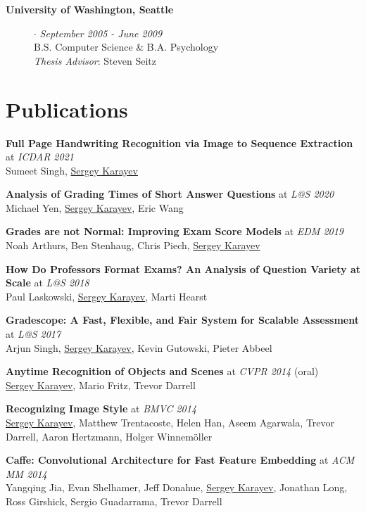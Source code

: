 \documentclass[line, margin]{res}
\begin{document}
\begin{resume}
\begin{description}
\item[{\bf University of Washington, Seattle}] $\cdot$ {\it September 2005 - June 2009}
\\B.S. Computer Science \& B.A. Psychology
\\\emph{Thesis Advisor}: Steven Seitz
\end{description}


\section{\sc Publications}

\textbf{Full Page Handwriting Recognition via Image to Sequence Extraction} at \emph{ICDAR 2021}\\
Sumeet Singh, \underline{Sergey Karayev}

\textbf{Analysis of Grading Times of Short Answer Questions} at \emph{L@S 2020}\\
Michael Yen, \underline{Sergey Karayev}, Eric Wang

\textbf{Grades are not Normal: Improving Exam Score Models} at \emph{EDM 2019}\\
Noah Arthurs, Ben Stenhaug, Chris Piech, \underline{Sergey Karayev}

\textbf{How Do Professors Format Exams? An Analysis of Question Variety at Scale} at \emph{L@S 2018}\\
Paul Laskowski, \underline{Sergey Karayev}, Marti Hearst

\textbf{Gradescope: A Fast, Flexible, and Fair System for Scalable Assessment} at \emph{L@S 2017}\\
Arjun Singh, \underline{Sergey Karayev}, Kevin Gutowski, Pieter Abbeel

\textbf{Anytime Recognition of Objects and Scenes} at \emph{CVPR 2014} (oral)\\
\underline{Sergey Karayev}, Mario Fritz, Trevor Darrell

\textbf{Recognizing Image Style} at \emph{BMVC 2014}\\
\underline{Sergey Karayev}, Matthew Trentacoste, Helen Han, Aseem Agarwala, Trevor Darrell, Aaron Hertzmann, Holger Winnem\"{o}ller

\textbf{Caffe: Convolutional Architecture for Fast Feature Embedding} at \emph{ACM MM 2014}\\
Yangqing Jia, Evan Shelhamer, Jeff Donahue, \underline{Sergey Karayev},
Jonathan Long, Ross Girshick, Sergio Guadarrama, Trevor Darrell


\end{resume}
\end{document}
